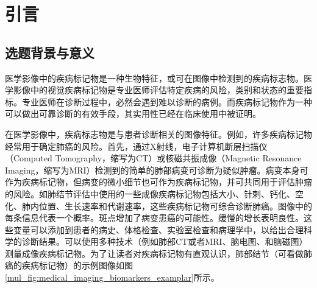 \chapter{引言}\label{cha:introduction}
\section{选题背景与意义}
\label{sec:background}
医学影像中的疾病标记物是一种生物特征，或可在图像中检测到的疾病标志物。医学影像中的视觉疾病标记物是专业医师评估特定疾病的风险，类别和状态的重要指标。专业医师在诊断过程中，必然会遇到难以诊断的病例。而疾病标记物作为一种可以做出可靠诊断的有效手段，其实用性已经在临床使用中被证明。

在医学影像中，疾病标志物是与患者诊断相关的图像特征。例如，许多疾病标记物经常用于确定肺癌的风险。首先，通过X射线，电子计算机断层扫描仪（Computed Tomography，缩写为CT）或核磁共振成像（Magnetic Resonance Imaging，缩写为MRI）检测到的简单的肺部病变可诊断为疑似肿瘤。病变本身可作为疾病标记物，但病变的微小细节也可作为疾病标记物，并可共同用于评估肿瘤的风险。如肺结节评估中使用的一些成像疾病标记物包括大小、针刺、钙化、空化、肺内位置、生长速率和代谢速率，这些疾病标记物可综合诊断肺癌。图像中的每条信息代表一个概率。斑点增加了病变患癌的可能性。缓慢的增长表明良性。这些变量可以添加到患者的病史、体格检查、实验室检查和病理学中，以给出合理科学的诊断结果。可以使用多种技术（例如肺部CT或者MRI、脑电图、和脑磁图）测量成像疾病标记物。为了让读者对疾病标记物有直观认识，肺部结节（可看做肺癌的疾病标记物）的示例图像如图\ref{mul_fig:medical_imaging_biomarkers_examplar}所示。

